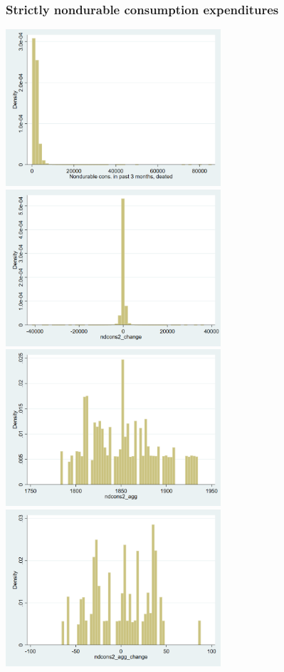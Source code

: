 \documentclass[12pt,a4paper]{article}
\begin{document}
\subsubsection*{Strictly nondurable consumption expenditures}
\begin{center}
\includegraphics[width=8cm]{graphs/ndcons2.png}
\includegraphics[width=8cm]{graphs/ndcons2_change.png}\\
\includegraphics[width=8cm]{graphs/ndcons2_agg.png}
\includegraphics[width=8cm]{graphs/ndcons2_agg_change.png}\\

\end{center}
\end{document}
